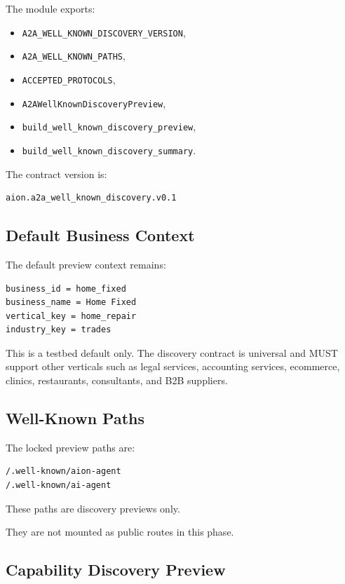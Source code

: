 The module exports:

\begin{itemize}
  \item \texttt{A2A\_WELL\_KNOWN\_DISCOVERY\_VERSION},
  \item \texttt{A2A\_WELL\_KNOWN\_PATHS},
  \item \texttt{ACCEPTED\_PROTOCOLS},
  \item \texttt{A2AWellKnownDiscoveryPreview},
  \item \texttt{build\_well\_known\_discovery\_preview},
  \item \texttt{build\_well\_known\_discovery\_summary}.
\end{itemize}

The contract version is:

\begin{verbatim}
aion.a2a_well_known_discovery.v0.1
\end{verbatim}

\subsection{Default Business Context}

The default preview context remains:

\begin{verbatim}
business_id = home_fixed
business_name = Home Fixed
vertical_key = home_repair
industry_key = trades
\end{verbatim}

This is a testbed default only. The discovery contract is universal and MUST support other verticals such as legal services, accounting services, ecommerce, clinics, restaurants, consultants, and B2B suppliers.

\subsection{Well-Known Paths}

The locked preview paths are:

\begin{verbatim}
/.well-known/aion-agent
/.well-known/ai-agent
\end{verbatim}

These paths are discovery previews only.

They are not mounted as public routes in this phase.

\subsection{Capability Discovery Preview}

